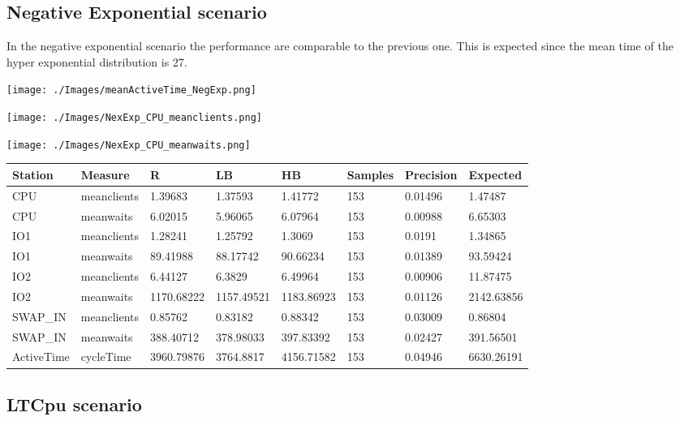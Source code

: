 \documentclass[12pt,a4paper]{article}
\begin{document}
\subsection{Negative Exponential scenario}

In the negative exponential scenario the performance are comparable to the previous one. This is expected since the mean time of the hyper exponential distribution is 27. 

\texttt{[image: ./Images/meanActiveTime\_NegExp.png]}

\texttt{[image: ./Images/NexExp\_CPU\_meanclients.png]}

\texttt{[image: ./Images/NexExp\_CPU\_meanwaits.png]}


\begin{table}[!ht]
    \centering
    \begin{tabular}{|l|l|l|l|l|l|l|l|}
    \hline
        Station & Measure & R & LB & HB & Samples & Precision & Expected \\ \hline
        CPU & meanclients & 1.39683 & 1.37593 & 1.41772 & 153 & 0.01496 & 1.47487 \\ \hline
        CPU & meanwaits & 6.02015 & 5.96065 & 6.07964 & 153 & 0.00988 & 6.65303 \\ \hline
        IO1 & meanclients & 1.28241 & 1.25792 & 1.3069 & 153 & 0.0191 & 1.34865 \\ \hline
        IO1 & meanwaits & 89.41988 & 88.17742 & 90.66234 & 153 & 0.01389 & 93.59424 \\ \hline
        IO2 & meanclients & 6.44127 & 6.3829 & 6.49964 & 153 & 0.00906 & 11.87475 \\ \hline
        IO2 & meanwaits & 1170.68222 & 1157.49521 & 1183.86923 & 153 & 0.01126 & 2142.63856 \\ \hline
        SWAP\_IN & meanclients & 0.85762 & 0.83182 & 0.88342 & 153 & 0.03009 & 0.86804 \\ \hline
        SWAP\_IN & meanwaits & 388.40712 & 378.98033 & 397.83392 & 153 & 0.02427 & 391.56501 \\ \hline
        ActiveTime & cycleTime & 3960.79876 & 3764.8817 & 4156.71582 & 153 & 0.04946 & 6630.26191 \\ \hline
    \end{tabular}
\end{table}


\subsection{LTCpu scenario}
\end{document}
